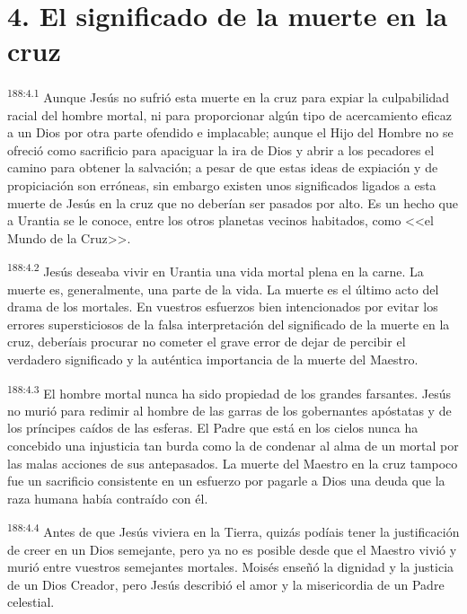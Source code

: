 \section*{4. El significado de la muerte en la cruz}
\par 
\textsuperscript{188:4.1} Aunque Jesús no sufrió esta muerte en la cruz para expiar la culpabilidad racial del hombre mortal, ni para proporcionar algún tipo de acercamiento eficaz a un Dios por otra parte ofendido e implacable; aunque el Hijo del Hombre no se ofreció como sacrificio para apaciguar la ira de Dios y abrir a los pecadores el camino para obtener la salvación; a pesar de que estas ideas de expiación y de propiciación son erróneas, sin embargo existen unos significados ligados a esta muerte de Jesús en la cruz que no deberían ser pasados por alto. Es un hecho que a Urantia se le conoce, entre los otros planetas vecinos habitados, como <<el Mundo de la Cruz>>.

\par 
\textsuperscript{188:4.2} Jesús deseaba vivir en Urantia una vida mortal plena en la carne. La muerte es, generalmente, una parte de la vida. La muerte es el último acto del drama de los mortales. En vuestros esfuerzos bien intencionados por evitar los errores supersticiosos de la falsa interpretación del significado de la muerte en la cruz, deberíais procurar no cometer el grave error de dejar de percibir el verdadero significado y la auténtica importancia de la muerte del Maestro.

\par 
\textsuperscript{188:4.3} El hombre mortal nunca ha sido propiedad de los grandes farsantes. Jesús no murió para redimir al hombre de las garras de los gobernantes apóstatas y de los príncipes caídos de las esferas. El Padre que está en los cielos nunca ha concebido una injusticia tan burda como la de condenar al alma de un mortal por las malas acciones de sus antepasados. La muerte del Maestro en la cruz tampoco fue un sacrificio consistente en un esfuerzo por pagarle a Dios una deuda que la raza humana había contraído con él.

\par 
\textsuperscript{188:4.4} Antes de que Jesús viviera en la Tierra, quizás podíais tener la justificación de creer en un Dios semejante, pero ya no es posible desde que el Maestro vivió y murió entre vuestros semejantes mortales. Moisés enseñó la dignidad y la justicia de un Dios Creador, pero Jesús describió el amor y la misericordia de un Padre celestial.

